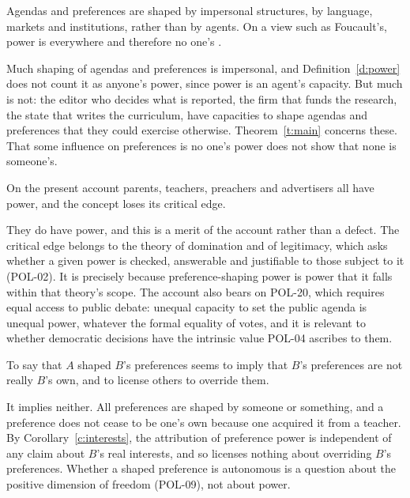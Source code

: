 \documentclass{situationist-preprint}
\begin{document}
\begin{objection}
Agendas and preferences are shaped by impersonal structures, by language, markets and institutions, rather than by agents. On a view such as Foucault's, power is everywhere and therefore no one's \citep{Foucault1975}.
\end{objection}

\begin{reply}
Much shaping of agendas and preferences is impersonal, and Definition~\ref{d:power} does not count it as anyone's power, since power is an agent's capacity. But much is not: the editor who decides what is reported, the firm that funds the research, the state that writes the curriculum, have capacities to shape agendas and preferences that they could exercise otherwise. Theorem~\ref{t:main} concerns these. That some influence on preferences is no one's power does not show that none is someone's.
\end{reply}

\begin{objection}
On the present account parents, teachers, preachers and advertisers all have power, and the concept loses its critical edge.
\end{objection}

\begin{reply}
They do have power, and this is a merit of the account rather than a defect. The critical edge belongs to the theory of domination and of legitimacy, which asks whether a given power is checked, answerable and justifiable to those subject to it (POL-02). It is precisely because preference-shaping power is power that it falls within that theory's scope. The account also bears on POL-20, which requires equal access to public debate: unequal capacity to set the public agenda is unequal power, whatever the formal equality of votes, and it is relevant to whether democratic decisions have the intrinsic value POL-04 ascribes to them.
\end{reply}

\begin{objection}[Paternalism]
To say that $A$ shaped $B$'s preferences seems to imply that $B$'s preferences are not really $B$'s own, and to license others to override them.
\end{objection}

\begin{reply}
It implies neither. All preferences are shaped by someone or something, and a preference does not cease to be one's own because one acquired it from a teacher. By Corollary~\ref{c:interests}, the attribution of preference power is independent of any claim about $B$'s real interests, and so licenses nothing about overriding $B$'s preferences. Whether a shaped preference is autonomous is a question about the positive dimension of freedom (POL-09), not about power.
\end{reply}
\end{document}
